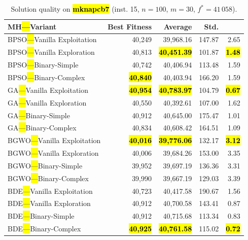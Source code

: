\documentclass[mathematics,article,accept,moreauthors]{Definitions/mdpi}
\begin{document}
\vspace{-9pt}

\begin{table}[H]
  \small
  \caption{Solution quality on \textbf{\hl{mknapcb7}} (inst. 15, $n=100$, $m=30$, $f^*=41\,058$).}
  \label{tab:calidad_mknapcb7_15}
  \begin{tabularx}{\textwidth}{lRRRR}
    \toprule
    \textbf{MH\hl{---}Variant} &
    \textbf{Best Fitness} &
    \textbf{Average} &
    \textbf{Std.} &
    \textbf{} \\
    \midrule
    BPSO\hl{---}Vanilla Exploitation &          40,249 &         39,968.16 & 147.87 &         2.65 \\
    BPSO\hl{---}Vanilla Exploration  &          40,813 & \textbf{\hl{40,451.39}} & 101.87 & \textbf{\hl{1.48}} \\
    BPSO\hl{---}Binary-Simple        &          40,742 &         40,406.94 & 113.48 &         1.59 \\
    BPSO\hl{---}Binary-Complex       & \textbf{\hl{40,840}} &         40,403.94 & 166.20 &         1.59 \\
    \midrule
    GA\hl{---}Vanilla Exploitation   & \textbf{\hl{40,954}} & \textbf{\hl{40,783.97}} & 104.79 & \textbf{\hl{0.67}} \\
    GA\hl{---}Vanilla Exploration    &          40,550 &         40,392.61 & 107.00 &         1.62 \\
    GA\hl{---}Binary-Simple          &          40,912 &         40,645.00 & 175.47 &         1.01 \\
    GA\hl{---}Binary-Complex         &          40,834 &         40,608.42 & 164.51 &         1.09 \\
    \midrule
    BGWO\hl{---}Vanilla Exploitation & \textbf{\hl{40,016}} & \textbf{\hl{39,776.06}} & 132.17 & \textbf{\hl{3.12}} \\
    BGWO\hl{---}Vanilla Exploration  &          40,006 &         39,684.26 & 153.00 &         3.35 \\
    BGWO\hl{---}Binary-Simple        &          39,952 &         39,697.19 & 136.36 &         3.31 \\
    BGWO\hl{---}Binary-Complex       &          39,990 &         39,667.19 & 129.03 &         3.39 \\
    \midrule
    BDE\hl{---}Vanilla Exploitation  &          40,723 &         40,417.58 & 190.67 &         1.56 \\
    BDE\hl{---}Vanilla Exploration   &          40,912 &         40,700.58 & 143.41 &         0.87 \\
    BDE\hl{---}Binary-Simple         &          40,912 &         40,715.68 & 113.34 &         0.83 \\
    BDE\hl{---}Binary-Complex        & \textbf{\hl{40,925}} & \textbf{\hl{40,761.58}} & 115.02 & \textbf{\hl{0.72}} \\
    \bottomrule
  \end{tabularx}
\end{table}
\end{document}
